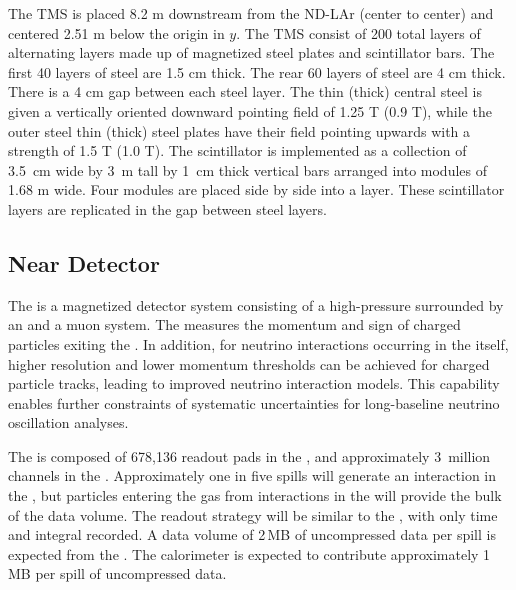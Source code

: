 \documentclass[../main-v1.tex]{subfiles}
\begin{document}
The TMS is placed 8.2 m downstream from the ND-LAr (center to center) and centered 2.51 m below the origin in $y$. The TMS consist of 200 total layers of alternating layers made up of magnetized steel plates and scintillator bars. The first 40 layers of steel are 1.5 cm thick. The rear 60 layers of steel are 4 cm thick. There is a 4 cm gap between each steel layer.  The thin (thick) central steel is given a vertically oriented downward pointing field of 1.25 T (0.9 T), while the outer steel thin (thick) steel plates have their field pointing upwards with a strength of 1.5 T (1.0 T). The scintillator is implemented as a collection of 3.5~cm wide by 3~m tall by 1~cm thick vertical bars arranged into modules of 1.68 m wide. Four modules are placed side by side into a layer. These scintillator layers are replicated in the gap between steel layers.  

 

\subsection{Near Detector  }
\label{sec:comp-dataestimates-gartpc}

The  is a magnetized detector system consisting of a high-pressure  surrounded by an  and a muon system. The  measures the momentum and sign of charged particles exiting the . In addition, for neutrino interactions occurring in the  itself, higher resolution and lower momentum thresholds can be achieved for charged particle tracks, leading to improved neutrino interaction models. This capability enables further constraints of systematic uncertainties for long-baseline neutrino  oscillation analyses.

The  is composed of 678,136 readout pads in the , and approximately 3~million channels in the .  Approximately one in five spills will generate an interaction in the , but particles entering the gas from interactions in the  will provide the bulk of the data volume.  The readout strategy will be similar to the , with only time and integral recorded. A  data volume of 2\,MB of uncompressed data per spill is expected from the .  The calorimeter is expected to contribute approximately 1\,MB per spill of uncompressed data.

\end{document}
